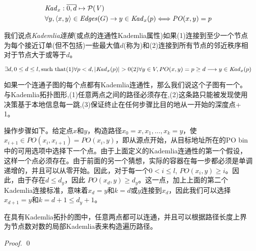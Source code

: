 \begin{definition}\label{def:kademlia-table}
\begin{equation}
\begin{split}
&\mathit{Kad}_x: \overline{0,d} \mapsto \mathcal{P}(\mathit{V})\\
&\forall y, \langle x, y \rangle \in \mathit{Edges}(G) \rightarrow y \in \mathit{Kad}_x(p) \Longleftrightarrow \mathit{PO}(x,y)=p 
\end{split}
\end{equation}
\end{definition}

我们说点\emph{Kademlia连接}(或点的连通性Kademlia属性)如果(1)连接到至少一个节点为每个接近订单(但不包括)一些最大值$d$(称为)和(2)连接到所有节点的邻近秩序相对于节点大于或等于$d$。

\begin{definition}\label{sec:kademlia-connectivity}
\begin{equation}
\exists d, 0\leq d \leq l, \text{such that}
\begin{subequations}
(1)\forall p<d, |\mathit{Kad}_x(p)|>0 \\
(2)\forall y\in V, PO(x,y)=p\geq d \longrightarrow y\in\mathit{Kad}_x(p) 
\end{subequations}
\end{equation}
\end{definition}


如果一个连通子图的每个点都有Kademlia连通性，那么我们说这个子图有一个。与Kademlia拓扑图形,(1)任意两点之间的路径必须存在,(2)这条路只能被发现使用决策基于本地信息每一跳,(3)保证终止在任何步骤比目的地从一开始的深度点+ 1。 

操作步骤如下。给定点$x$和$y$，构造路径$x_0=x , x_1, ..., x_k=y$，使$x_{i+1}\in \mathit{PO}(x_i, x_{i+1})=\mathit{PO}(x_i, y)$，即从源点开始，从目标地址所在的PO bin中的可用选项中选择下一个点。由于上面定义的Kademlia连通性的第一个假设，这样一个点必须存在。由于前面的另一个猜想，实际的容器在每一步都必须是单调递增的，并且可以从零开始。因此，对于每一个$0<i\leq l$, $\mathit{PO}(x_{i}, y)\geq i$。因此，由于存在$d\leq d_y$，因此 
$\mathit{PO}(x_{d}, y)\geq d_y$。这一点，加上上面的第二个Kademlia连接标准，意味着$x_d=y$和$k=d$或$y$连接到$x_d$，因此我们可以选择$x_{d+1}=y$和$k=d+1\leq d_y+1$。

\begin{theorem}{在具有Kademlia拓扑的图中，任意两点都可以连通，并且可以根据路径长度上界为节点数对数的局部Kademlia表来构造遍历路径。}

\begin{proof}



\qed
\end{proof}
\end{theorem}

